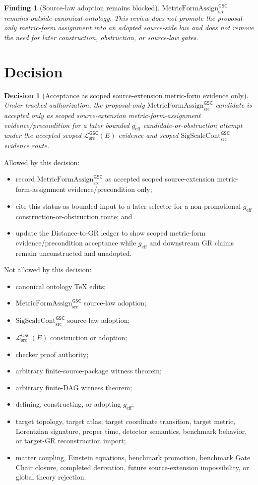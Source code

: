 \documentclass[11pt]{article}
\newcommand{\MetricData}{\mathcal{L}_{\mathrm{src}}^{\mathsf{GSC}}}
\newcommand{\geff}{g_{\mathrm{eff}}}
\newcommand{\SigScaleCont}{\mathrm{SigScaleCont}_{\mathrm{src}}^{\mathsf{GSC}}}
\newcommand{\MetricFormAssign}{\mathrm{MetricFormAssign}_{\mathrm{src}}^{\mathsf{GSC}}}
\newtheorem{decision}{Decision}
\newtheorem{finding}{Finding}
\begin{document}
\begin{finding}[Source-law adoption remains blocked]
\(\MetricFormAssign\) remains outside canonical ontology. This review does
not promote the proposal-only metric-form assignment into an adopted
source-side law and does not remove the need for later construction,
obstruction, or source-law gates.
\end{finding}

\section{Decision}

\begin{decision}[Acceptance as scoped source-extension metric-form evidence only]
Under tracked authorization, the proposal-only \(\MetricFormAssign\) candidate
is accepted only as scoped source-extension metric-form-assignment
evidence/precondition for a later bounded \(\geff\)
candidate-or-obstruction attempt under the accepted scoped \(\MetricData(E)\)
evidence and scoped \(\SigScaleCont\) evidence route.
\end{decision}

Allowed by this decision:
\begin{itemize}[leftmargin=*]
  \item record \(\MetricFormAssign\) as accepted scoped source-extension
  metric-form-assignment evidence/precondition only;
  \item cite this status as bounded input to a later selector for a
  non-promotional \(\geff\) construction-or-obstruction route; and
  \item update the Distance-to-GR ledger to show scoped metric-form
  evidence/precondition acceptance while \(\geff\) and downstream GR claims
  remain unconstructed and unadopted.
\end{itemize}

Not allowed by this decision:
\begin{itemize}[leftmargin=*]
  \item canonical ontology TeX edits;
  \item \(\MetricFormAssign\) source-law adoption;
  \item \(\SigScaleCont\) source-law adoption;
  \item \(\MetricData(E)\) construction or adoption;
  \item checker proof authority;
  \item arbitrary finite-source-package witness theorem;
  \item arbitrary finite-DAG witness theorem;
  \item defining, constructing, or adopting \(\geff\);
  \item target topology, target atlas, target coordinate transition, target
  metric, Lorentzian signature, proper time, detector semantics, benchmark
  behavior, or target-GR reconstruction import;
  \item matter coupling, Einstein equations, benchmark promotion, benchmark
  Gate Chair closure, completed derivation, future source-extension
  impossibility, or global theory rejection.
\end{itemize}
\end{document}
